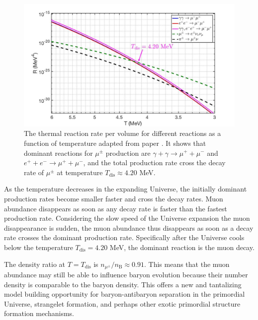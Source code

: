 \documentclass[Universe,article,submit,moreauthors,pdftex]{Definitions/mdpi}
\begin{document}
\begin{figure}[h]
\centering
\includegraphics[width=\linewidth]{MuonRate_New3.jpg}
\caption{The thermal reaction rate per volume for different reactions as a function of temperature adapted from paper \cite{Rafelski:2021aey}. It shows that dominant reactions for $\mu^\pm$ production are ${\gamma+\gamma\to\mu^++\mu^-}$ and $e^++e^-\to\mu^++\mu^-$, and the total production rate cross the decay rate of $\mu^\pm$ at temperature $T_\mathrm{dis}\approx 4.20$ MeV.}
\label{muon_fig} 
\end{figure}

As the temperature decreases in the expanding Universe, the initially dominant production rates become smaller faster and cross the decay rates. Muon abundance disappears as soon as any decay rate is faster than the fastest production rate. Considering the slow speed of the Universe expansion the muon disappearance is sudden, the muon abundance thus disappears as soon as a decay rate crosses the dominant production rate. Specifically after the Universe cools below the temperature $T_\mathrm{dis} = 4.20$ MeV, the dominant reaction is the muon decay.

The density ratio at $T=T_\mathrm{dis}$ is $n_{\mu^\pm}/n_\mathrm{B}\approx0.91$. This means that the muon abundance may still be able to influence baryon evolution because their number density is comparable to the baryon density. This offers a new and tantalizing model building opportunity for  baryon-antibaryon separation in the primordial Universe, strangelet formation, and perhaps other exotic primordial structure formation mechanisms.

\end{document}
